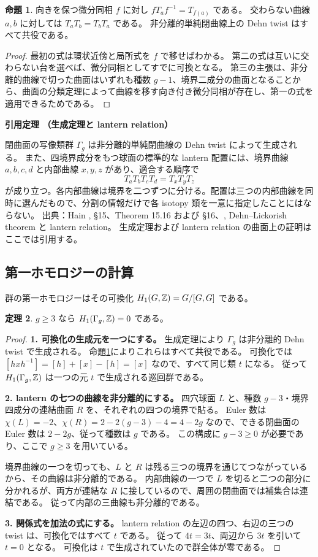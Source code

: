 \documentclass[dvipdfmx,a4paper,11pt]{article}
\theoremstyle{definition}
\newtheorem{thm}{定理}[section]
\newtheorem{prop}[thm]{命題}
\newenvironment{external}[1]{\Needspace{7\baselineskip}\refstepcounter{thm}\begin{tcolorbox}[mybox,colback=blue!2,colframe=blue!40!black]\textbf{引用定理 \thethm（#1）}\par}{\end{tcolorbox}}
\begin{document}
\begin{prop}\label{prop:twistrelations}
向きを保つ微分同相 $f$ に対し $fT_af^{-1}=T_{f(a)}$ である。
交わらない曲線 $a,b$ に対しては $T_aT_b=T_bT_a$ である。
非分離的単純閉曲線上の Dehn twist はすべて共役である。
\end{prop}
\begin{proof}
最初の式は環状近傍と局所式を $f$ で移せばわかる。
第二の式は互いに交わらない台を選べば、微分同相としてすでに可換となる。
第三の主張は、非分離的曲線で切った曲面はいずれも種数 $g-1$、境界二成分の曲面となることから、曲面の分類定理によって曲線を移す向き付き微分同相が存在し、第一の式を適用できるためである。
\end{proof}

\begin{external}{生成定理と lantern relation}\label{input:lantern}
閉曲面の写像類群 $\Gamma_g$ は非分離的単純閉曲線の Dehn twist によって生成される。
また、四境界成分をもつ球面の標準的な lantern 配置には、境界曲線 $a,b,c,d$ と内部曲線 $x,y,z$ があり、適合する順序で
\[
T_aT_bT_cT_d=T_xT_yT_z
\]
が成り立つ。各内部曲線は境界を二つずつに分ける。配置は三つの内部曲線を同時に選んだもので、分割の情報だけで各 isotopy 類を一意に指定したことにはならない。
出典：Hain \cite{Hain}, \S15、Theorem 15.16 および \S16、\cite{FM}, Dehn--Lickorish theorem と lantern relation。
生成定理および lantern relation の曲面上の証明はここでは引用する。
\end{external}

\subsection{第一ホモロジーの計算}
群の第一ホモロジーはその可換化 $H_1(G,\mathbb Z)=G/[G,G]$ である。
\begin{thm}\label{thm:h1high}
$g\ge3$ なら $H_1(\Gamma_g,\mathbb Z)=0$ である。
\end{thm}
\begin{proof}
\textbf{1. 可換化の生成元を一つにする。}
生成定理により $\Gamma_g$ は非分離的 Dehn twist で生成される。
命題\ref{prop:twistrelations}によりこれらはすべて共役である。
可換化では $[hxh^{-1}]=[h]+[x]-[h]=[x]$ なので、すべて同じ類 $t$ になる。
従って $H_1(\Gamma_g,\mathbb Z)$ は一つの元 $t$ で生成される巡回群である。

\textbf{2. lantern の七つの曲線を非分離的にする。}
四穴球面 $L$ と、種数 $g-3$・境界四成分の連結曲面 $R$ を、それぞれの四つの境界で貼る。
Euler 数は $\chi(L)=-2$、$\chi(R)=2-2(g-3)-4=4-2g$ なので、できる閉曲面の Euler 数は $2-2g$、従って種数は $g$ である。
この構成に $g-3\ge0$ が必要であり、ここで $g\ge3$ を用いている。

境界曲線の一つを切っても、$L$ と $R$ は残る三つの境界を通じてつながっているから、その曲線は非分離的である。
内部曲線の一つで $L$ を切ると二つの部分に分かれるが、両方が連結な $R$ に接しているので、周囲の閉曲面では補集合は連結である。
従って内部の三曲線も非分離的である。

\textbf{3. 関係式を加法の式にする。}
lantern relation の左辺の四つ、右辺の三つの twist は、可換化ではすべて $t$ である。
従って $4t=3t$、両辺から $3t$ を引いて $t=0$ となる。
可換化は $t$ で生成されていたので群全体が零である。
\end{proof}
\end{document}

